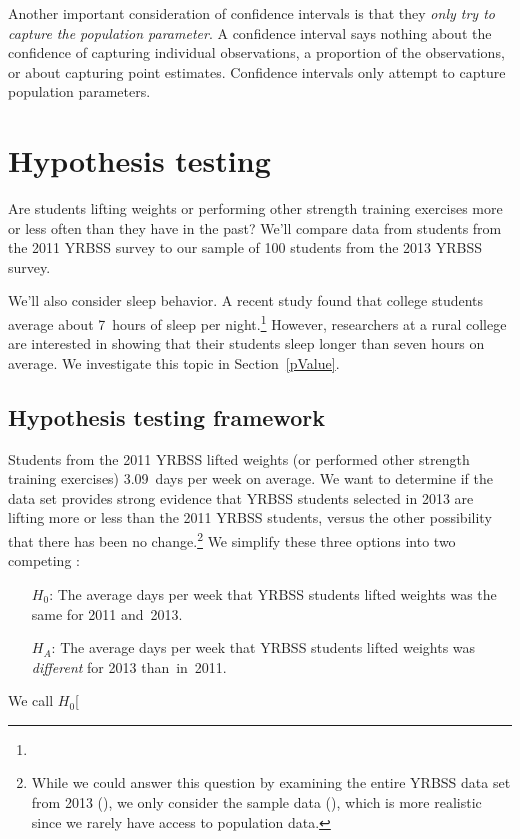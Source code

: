 Another important consideration of confidence intervals is that they \emph{only try to capture the population parameter}. A confidence interval says nothing about the confidence of capturing individual observations, a proportion of the observations, or about capturing point estimates. Confidence intervals only attempt to capture population parameters.




\section[Hypothesis testing]{Hypothesis testing }
\label{hypothesisTesting}


Are students lifting weights or performing other strength training exercises more or less often than they have in the past? We'll compare data from students from the 2011 YRBSS survey to our sample of 100 students from the 2013 YRBSS survey.

We'll also consider sleep behavior. A recent study found that college students average about 7~hours of sleep per night.\footnote{} However, researchers at a rural college are interested in showing that their students sleep longer than seven hours on average. We investigate this topic in Section~\ref{pValue}.

\subsection{Hypothesis testing framework}

Students from the 2011 YRBSS lifted weights (or performed other strength training exercises) 3.09~days per week on average. We want to determine if the  data set provides strong evidence that YRBSS students selected in 2013 are lifting more or less than the 2011 YRBSS students, versus the other possibility that there has been no change.\footnote{While we could answer this question by examining the entire YRBSS data set from 2013 (), we only consider the sample data (), which is more realistic since we rarely have access to population data.} We simplify these three options into two competing :
\begin{itemize}
\setlength{\itemsep}{0mm}
\item[$H_0$:] The average days per week that YRBSS students lifted weights was the same for 2011 and~2013.
\item[$H_A$:] The average days per week that YRBSS students lifted weights was \emph{different} for 2013 than~in~2011.
\end{itemize}
We call $H_0$\marginpar[\raggedright\vspace{6mm}

